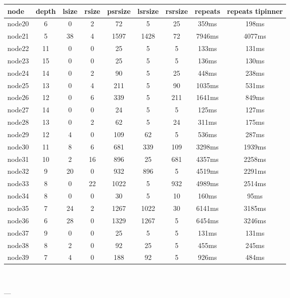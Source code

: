 \begin{tabular}{|l|c|c|c|c|c|c|c|c|}
\hline node & depth & lsize & rsize & psrsize & lsrsize & rsrsize   & repeats & repeats tipinner\\
    \hline node20 & 6 & 0 & 2 & 72 & 5 & 25 & 359ms & 198ms\\
    \hline node21 & 5 & 38 & 4 & 1597 & 1428 & 72 & 7946ms & 4077ms\\
    \hline node22 & 11 & 0 & 0 & 25 & 5 & 5 & 133ms & 131ms\\
    \hline node23 & 15 & 0 & 0 & 25 & 5 & 5 & 136ms & 130ms\\
    \hline node24 & 14 & 0 & 2 & 90 & 5 & 25 & 448ms & 238ms\\
    \hline node25 & 13 & 0 & 4 & 211 & 5 & 90 & 1035ms & 531ms\\
    \hline node26 & 12 & 0 & 6 & 339 & 5 & 211 & 1641ms & 849ms\\
    \hline node27 & 14 & 0 & 0 & 24 & 5 & 5 & 125ms & 127ms\\
    \hline node28 & 13 & 0 & 2 & 62 & 5 & 24 & 311ms & 175ms\\
    \hline node29 & 12 & 4 & 0 & 109 & 62 & 5 & 536ms & 287ms\\
    \hline node30 & 11 & 8 & 6 & 681 & 339 & 109 & 3298ms & 1939ms\\
    \hline node31 & 10 & 2 & 16 & 896 & 25 & 681 & 4357ms & 2258ms\\
    \hline node32 & 9 & 20 & 0 & 932 & 896 & 5 & 4519ms & 2291ms\\
    \hline node33 & 8 & 0 & 22 & 1022 & 5 & 932 & 4989ms & 2514ms\\
    \hline node34 & 8 & 0 & 0 & 30 & 5 & 10 & 160ms & 95ms\\
    \hline node35 & 7 & 24 & 2 & 1267 & 1022 & 30 & 6141ms & 3185ms\\
    \hline node36 & 6 & 28 & 0 & 1329 & 1267 & 5 & 6454ms & 3246ms\\
    \hline node37 & 9 & 0 & 0 & 25 & 5 & 5 & 131ms & 131ms\\
    \hline node38 & 8 & 2 & 0 & 92 & 25 & 5 & 455ms & 245ms\\
    \hline node39 & 7 & 4 & 0 & 188 & 92 & 5 & 926ms & 484ms\\

\hline
\end{tabular} \

---


